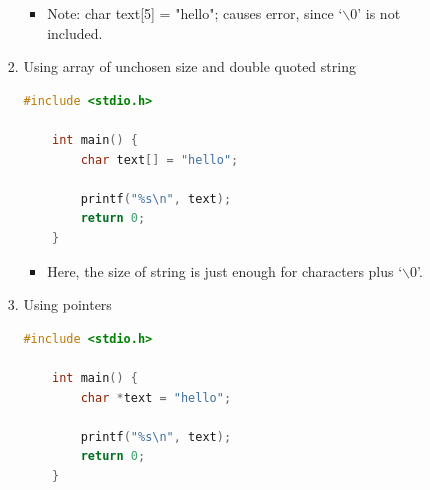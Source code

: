 \documentclass[12pt]{article}
\begin{document}
\begin{itemize}
\begin{itemize}
\begin{enumerate}[1.]
\begin{itemize}
                \item Note: char text[5] = "hello"; causes error, since `$\backslash0$'
                is not included.
            \end{itemize}

            \item Using array of unchosen size and double quoted string

    \begin{lstlisting}[language=c]
    #include <stdio.h>

    int main() {
        char text[] = "hello";

        printf("%s\n", text);
        return 0;
    }
    \end{lstlisting}

            \begin{itemize}
                \item Here, the size of string is just enough for characters plus `$\backslash0$'.
            \end{itemize}

            \item Using pointers


    \begin{lstlisting}[language=c]
    #include <stdio.h>

    int main() {
        char *text = "hello";

        printf("%s\n", text);
        return 0;
    }
    \end{lstlisting}

        \end{enumerate}
    \end{itemize}
\end{itemize}
\end{document}
